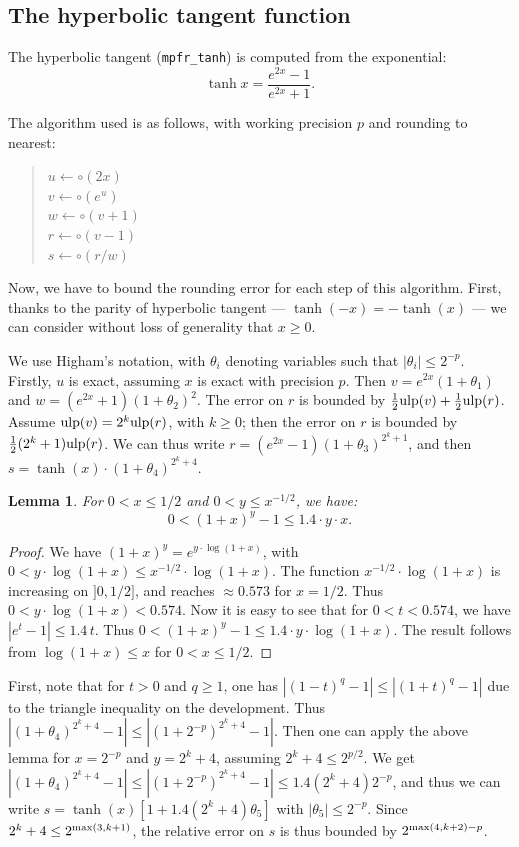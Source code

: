 \documentclass[12pt]{amsart}
\def\ulp{{\rm ulp}}
\newtheorem{lemma}{Lemma}
\begin{document}
\subsection{The hyperbolic tangent function}

The hyperbolic tangent (\texttt{mpfr\_tanh}) is computed from the exponential:
\[ \tanh x = \frac{ e^{2 x} -1 }{ e^{2 x} +1}. \]

The algorithm used is as follows, with working
precision $p$ and rounding to nearest:
\begin{quote}
$u \leftarrow \circ(2 x)$ \\
$v \leftarrow \circ(e^u)$ \\
$w \leftarrow \circ(v+1)$ \\
$r \leftarrow \circ(v-1)$ \\
$s \leftarrow \circ(r/w)$
\end{quote}
Now, we have to bound the rounding error for each step of this
algorithm.  First, thanks to the parity of hyperbolic tangent
--- $\tanh(-x)=-\tanh(x)$ --- we can consider without loss of generality
that $x \geq 0$.

We use Higham's notation, with $\theta_i$ denoting variables such that
$|\theta_i| \leq 2^{-p}$.
Firstly, $u$ is exact, assuming $x$ is exact with precision $p$.
Then $v = e^{2x} (1+\theta_1)$ and
$w = (e^{2x}+1) (1+\theta_2)^2$.
The error on $r$ is bounded by $\frac{1}{2} \ulp(v) + \frac{1}{2} \ulp(r)$.
Assume $\ulp(v) = 2^k \ulp(r)$, with $k \geq 0$;
then the error on $r$ is bounded by $\frac{1}{2} (2^k+1) \ulp(r)$.
We can thus write $r = (e^{2x}-1) (1+\theta_3)^{2^k+1}$,
and then $s = \tanh(x) \cdot (1+\theta_4)^{2^k+4}$.

\begin{lemma}
For $0 < x \leq 1/2$ and $0 < y \leq x^{-1/2}$, we have:
\[ 0 < (1+x)^y - 1 \leq 1.4 \cdot y \cdot x. \]
\end{lemma}
\begin{proof}
We have $(1+x)^y = e^{y \cdot \log(1+x)}$, with
$0 < y \cdot \log(1+x) \leq x^{-1/2} \cdot \log(1+x)$.
The function $x^{-1/2} \cdot \log(1+x)$ is increasing on $]0,1/2]$,
and reaches $\approx 0.573$ for $x = 1/2$.
Thus $0 < y \cdot \log(1+x) < 0.574$.
Now it is easy to see that for $0 < t < 0.574$, we have
$|e^t-1| \leq 1.4\,t$.
Thus $0 < (1+x)^y - 1 \leq 1.4 \cdot y \cdot \log(1+x)$.
The result follows from $\log(1+x) \leq x$ for
$0 < x \leq 1/2$.
\end{proof}

First, note that for $t > 0$ and $q \geq 1$, one has
$|(1-t)^q - 1| \leq |(1+t)^q - 1|$ due to the triangle inequality on the
development. Thus $|(1+\theta_4)^{2^k+4} - 1| \leq |(1+2^{-p})^{2^k+4} - 1|$.
Then one can apply the above lemma for $x=2^{-p}$ and $y=2^k+4$,
assuming $2^k+4 \leq 2^{p/2}$.
We get $|(1+\theta_4)^{2^k+4} - 1| \leq |(1+2^{-p})^{2^k+4} - 1|
\leq 1.4 (2^k+4) 2^{-p}$, and thus
we can write $s = \tanh(x) [1 + 1.4 (2^k+4)\theta_5]$ with
$|\theta_5| \leq 2^{-p}$.
Since $2^k+4 \leq 2^{{\rm max}(3,k+1)}$,
the relative error on $s$ is thus bounded by $2^{{\rm max}(4,k+2)-p}$.
\end{document}
